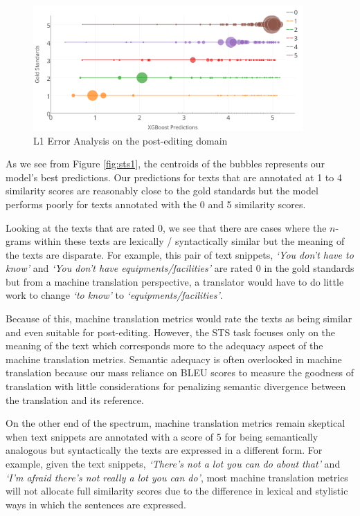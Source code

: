 \begin{figure}[!htb]
    \centering
    \includegraphics[width=0.92\textwidth]{images/saar-sheff-postediting}
    \caption{L1 Error Analysis on the post-editing domain}
    \label{fig:sts2}
\end{figure}

As we see from Figure \ref{fig:sts1}, the centroids of the bubbles represents our model's best predictions. Our predictions for texts that are annotated at 1 to 4 similarity scores are reasonably close to the gold standards but the model performs poorly for texts annotated with the 0 and 5 similarity scores. 

Looking at the texts that are rated 0, we see that there are cases where the $n$-grams within these texts are lexically / syntactically similar but the meaning of the texts are disparate. For example, this pair of text snippets, \emph{`You don't have to know'} and \emph{`You don't have equipments/facilities'} are rated 0 in the gold standards but from a machine translation perspective, a translator would have to do little work to change \emph{`to know'} to \emph{`equipments/facilities'}. 

Because of this, machine translation metrics would rate the texts as being similar and even suitable for post-editing. However, the STS task focuses only on the meaning of the text which corresponds more to the adequacy aspect of the machine translation metrics. Semantic adequacy is often overlooked in machine translation because our mass reliance on BLEU scores to measure the goodness of translation with little considerations for penalizing semantic divergence between the translation and its reference.

On the other end of the spectrum, machine translation metrics remain skeptical when text snippets are annotated with a score of 5 for being semantically analogous but syntactically the texts are expressed in a different form. For example, given the text snippets, \emph{`There's not a lot you can do about that'} and \emph{`I'm afraid there's not really a lot you can do'}, most machine translation metrics will not allocate full similarity scores due to the difference in lexical and stylistic ways in which the sentences are expressed. 

